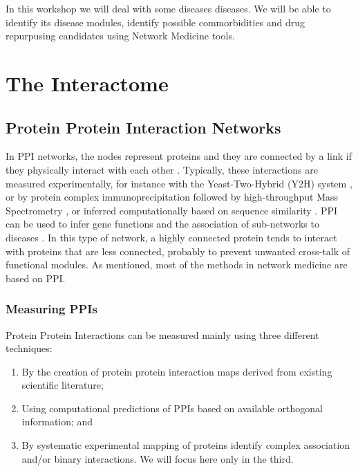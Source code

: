 \documentclass[
]{book}
\begin{document}
In this workshop we will deal with some diseases diseases. We will be able to identify its disease modules, identify possible commorbidities and drug repurpusing candidates using Network Medicine tools.

\hypertarget{PPI}{%
\chapter{The Interactome}\label{PPI}}

\hypertarget{protein-protein-interaction-networks}{%
\section{Protein Protein Interaction Networks}\label{protein-protein-interaction-networks}}

In PPI networks, the nodes represent proteins and they are connected by a link if they physically interact with each other \citep{rual2005}. Typically, these interactions are measured experimentally, for instance with the Yeast-Two-Hybrid (Y2H) system \citep{uetz2000}, or by protein complex immunoprecipitation followed by high-throughput Mass Spectrometry \citep{zhang2008, koh2012}, or inferred computationally based on sequence similarity \citep{fong2004}. PPI can be used to infer gene functions and the association of sub-networks to diseases \citep{Menche2015}. In this type of network, a highly connected protein tends to interact with proteins that are less connected, probably to prevent unwanted cross-talk of functional modules. As mentioned, most of the methods in network medicine are based on PPI.

\hypertarget{measuring-ppis}{%
\subsection{Measuring PPIs}\label{measuring-ppis}}

Protein Protein Interactions can be measured mainly using three different techniques:

\begin{enumerate}
\def\labelenumi{\arabic{enumi}.}
\item
  By the creation of protein protein interaction maps derived from existing scientific literature;
\item
  Using computational predictions of PPIs based on available orthogonal information; and
\item
  By systematic experimental mapping of proteins identify complex association and/or binary interactions. We will focus here only in the third.
\end{enumerate}
\end{document}
